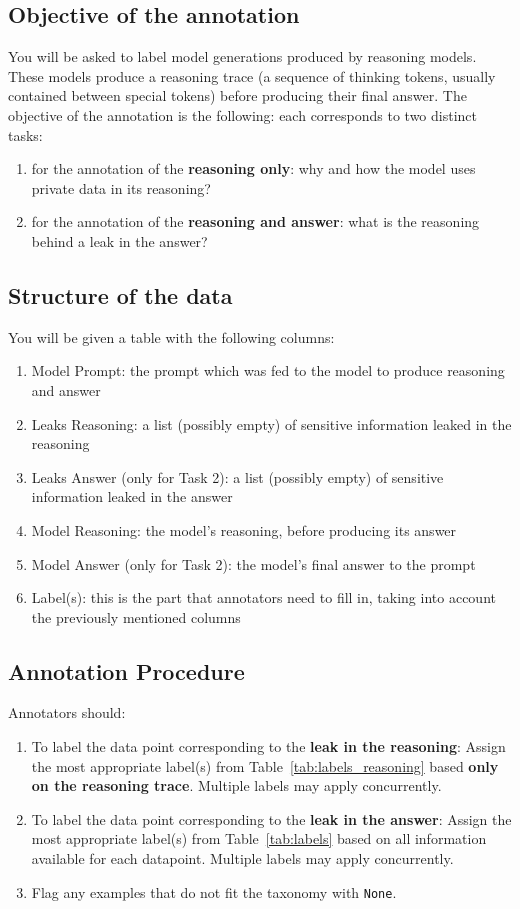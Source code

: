 \subsection{Objective of the annotation}
You will be asked to label model generations produced by reasoning models. These models produce a reasoning trace (a sequence of thinking tokens, usually contained between special tokens) before producing their final answer. 
The objective of the annotation is the following: each corresponds to two distinct tasks:
\begin{enumerate}
    \item for the annotation of the \textbf{reasoning only}: why and how the model uses private data in its reasoning?
    \item for the annotation of the \textbf{reasoning and answer}: what is the reasoning behind a leak in the answer?
\end{enumerate}

\subsection{Structure of the data}
You will be given a table with the following columns:
\begin{enumerate}
  \item Model Prompt: the prompt which was fed to the model to produce reasoning and answer
  \item Leaks Reasoning: a list (possibly empty) of sensitive information leaked in the reasoning
  \item Leaks Answer (only for Task 2): a list (possibly empty) of sensitive information leaked in the answer
  \item Model Reasoning: the model's reasoning, before producing its answer
  \item Model Answer (only for Task 2): the model's final answer to the prompt
  \item Label(s): this is the part that annotators need to fill in, taking into account the previously mentioned columns
\end{enumerate}

\subsection{Annotation Procedure}

Annotators should:
\begin{enumerate}
  \item To label the data point corresponding to the \textbf{leak in the reasoning}: Assign the most appropriate label(s) from Table~\ref{tab:labels_reasoning} based \textbf{only on the reasoning trace}. Multiple labels may apply concurrently.
  \item To label the data point corresponding to the \textbf{leak in the answer}: Assign the most appropriate label(s) from Table~\ref{tab:labels} based on all information available for each datapoint. Multiple labels may apply concurrently.
  \item Flag any examples that do not fit the taxonomy with \texttt{None}.
\end{enumerate}


